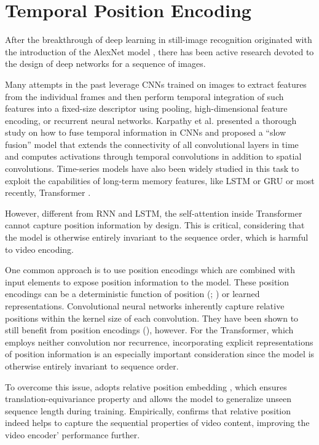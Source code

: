 \section{Temporal Position Encoding}
\label{sec:positional_encoding}

After the breakthrough of deep learning in still-image recognition originated with the introduction of the AlexNet model \cite{krizhevsky2012imagenet}, there has been active research devoted to the design of deep networks for a sequence of images. 

Many attempts in the past leverage CNNs trained on images to extract features from the individual frames and then perform temporal integration of such features into a fixed-size descriptor using pooling, high-dimensional feature encoding, or recurrent neural networks. Karpathy et al. \cite{karpathy2014large} presented a thorough study on how to fuse temporal information in CNNs and proposed a “slow fusion” model that extends the connectivity of all convolutional layers in time and computes activations through temporal convolutions in addition to spatial convolutions. Time-series models have also been widely studied in this task to exploit the capabilities of long-term memory features, like LSTM \cite{hochreiter1997long} or GRU \cite{cho2014properties} or most recently, Transformer \cite{vaswani2017attention}. 

However, different from RNN and LSTM, the self-attention inside Transformer cannot capture position information by design. This is critical, considering that the model is otherwise entirely invariant to the sequence order, which is harmful to video encoding.

One common approach is to use position encodings which are combined with input elements to
expose position information to the model. These position encodings can be a deterministic function of position (\cite{sukhbaatar2015end}; \cite{vaswani2017attention}) or learned representations. 
Convolutional neural networks inherently capture relative positions within the kernel size of each convolution. They have been shown to still benefit from position encodings (\cite{gehring2017convolutional}), however.
For the Transformer, which employs neither convolution nor recurrence, incorporating explicit
representations of position information is an especially important consideration since the model is
otherwise entirely invariant to sequence order.

To overcome this issue, \cite{jung2020global} adopts relative position embedding \cite{shaw2018self}, which ensures translation-equivariance property and allows the model to generalize unseen sequence length during training. Empirically, \cite{jung2020global}  confirms that relative position indeed helps to capture the sequential properties of video content, improving the video encoder' performance further.

